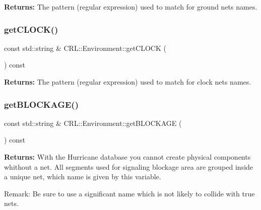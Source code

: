 {\bfseries Returns\+:} The pattern (regular expression) used to match for ground nets names. \mbox{\label{classCRL_1_1Environment_ab19c72626a542359bbf9cb17cdee23a8}} 
\subsubsection{\texorpdfstring{get\+C\+L\+O\+C\+K()}{getCLOCK()}}
{\footnotesize\ttfamily const std\+::string \& C\+R\+L\+::\+Environment\+::get\+C\+L\+O\+CK (\begin{DoxyParamCaption}{ }\end{DoxyParamCaption}) const\hspace{0.3cm}{\ttfamily [inline]}}

{\bfseries Returns\+:} The pattern (regular expression) used to match for clock nets names. \mbox{\label{classCRL_1_1Environment_a19adcaebb99dc8a316261ddff72f9b56}} 
\subsubsection{\texorpdfstring{get\+B\+L\+O\+C\+K\+A\+G\+E()}{getBLOCKAGE()}}
{\footnotesize\ttfamily const std\+::string \& C\+R\+L\+::\+Environment\+::get\+B\+L\+O\+C\+K\+A\+GE (\begin{DoxyParamCaption}{ }\end{DoxyParamCaption}) const\hspace{0.3cm}{\ttfamily [inline]}}

{\bfseries Returns\+:} With the Hurricane database you cannot create physical components whithout a net. All segments used for signaling blockage area are grouped inside a unique net, which name is given by this variable.

\begin{DoxyParagraph}{Remark\+:}
Be sure to use a significant name which is not likely to collide with true nets. 
\end{DoxyParagraph}
\mbox{\label{classCRL_1_1Environment_a5f0df5fadd73c2246f7e6775314bb5fa}} 
